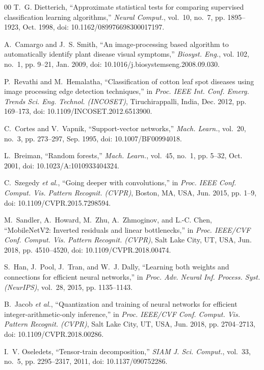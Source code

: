 \documentclass[journal]{IEEEtran}
\begin{document}
\begin{thebibliography}{00}
T.~G. Dietterich, ``Approximate statistical tests for comparing supervised classification learning algorithms,'' \textit{Neural Comput.}, vol.~10, no.~7, pp. 1895--1923, Oct. 1998, doi: 10.1162/089976698300017197.

A.~Camargo and J.~S. Smith, ``An image-processing based algorithm to automatically identify plant disease visual symptoms,'' \textit{Biosyst. Eng.}, vol. 102, no.~1, pp. 9--21, Jan. 2009, doi: 10.1016/j.biosystemseng.2008.09.030.

P.~Revathi and M.~Hemalatha, ``Classification of cotton leaf spot diseases using image processing edge detection techniques,'' in \textit{Proc. IEEE Int. Conf. Emerg. Trends Sci. Eng. Technol. (INCOSET)}, Tiruchirappalli, India, Dec. 2012, pp. 169--173, doi: 10.1109/INCOSET.2012.6513900.

C.~Cortes and V.~Vapnik, ``Support-vector networks,'' \textit{Mach. Learn.}, vol.~20, no.~3, pp. 273--297, Sep. 1995, doi: 10.1007/BF00994018.

L.~Breiman, ``Random forests,'' \textit{Mach. Learn.}, vol.~45, no.~1, pp. 5--32, Oct. 2001, doi: 10.1023/A:1010933404324.

C.~Szegedy \textit{et al.}, ``Going deeper with convolutions,'' in \textit{Proc. IEEE Conf. Comput. Vis. Pattern Recognit. (CVPR)}, Boston, MA, USA, Jun. 2015, pp. 1--9, doi: 10.1109/CVPR.2015.7298594.

M.~Sandler, A.~Howard, M.~Zhu, A.~Zhmoginov, and L.-C. Chen, ``MobileNetV2: Inverted residuals and linear bottlenecks,'' in \textit{Proc. IEEE/CVF Conf. Comput. Vis. Pattern Recognit. (CVPR)}, Salt Lake City, UT, USA, Jun. 2018, pp. 4510--4520, doi: 10.1109/CVPR.2018.00474.

S.~Han, J.~Pool, J.~Tran, and W.~J. Dally, ``Learning both weights and connections for efficient neural networks,'' in \textit{Proc. Adv. Neural Inf. Process. Syst. (NeurIPS)}, vol.~28, 2015, pp. 1135--1143.

B.~Jacob \textit{et al.}, ``Quantization and training of neural networks for efficient integer-arithmetic-only inference,'' in \textit{Proc. IEEE/CVF Conf. Comput. Vis. Pattern Recognit. (CVPR)}, Salt Lake City, UT, USA, Jun. 2018, pp. 2704--2713, doi: 10.1109/CVPR.2018.00286.

I.~V. Oseledets, ``Tensor-train decomposition,'' \textit{SIAM J. Sci. Comput.}, vol.~33, no.~5, pp. 2295--2317, 2011, doi: 10.1137/090752286.


\end{thebibliography}
\end{document}
